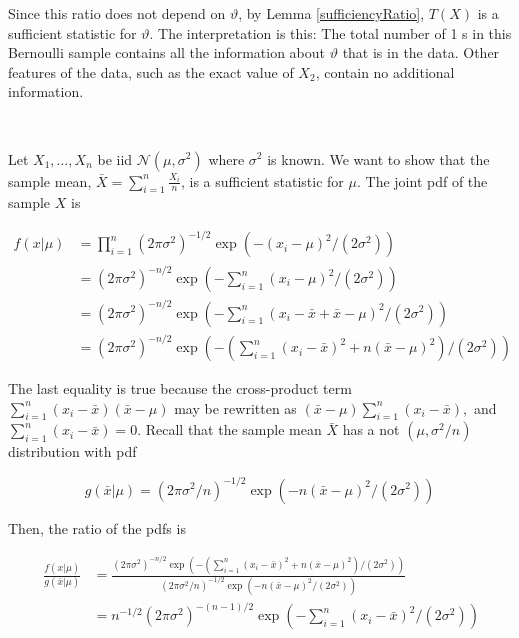 \documentclass[ 11pt,%
				a4paper,%
				twoside,%
				headinclude,%
				footinclude = true,%
				cleardoublepage = empty,%
				reqno]{scrbook}
\begin{document}
Since this ratio does not depend on $\vartheta$, by Lemma \ref{sufficiencyRatio}, $T({X})$ is a sufficient statistic for $\vartheta$. The interpretation is this: The total number of 1 s in this Bernoulli sample contains all the information about $\vartheta$ that is in the data. Other features of the data, such as the exact value of $X_{2}$, contain no additional information.

\begin{example}~\label{normal sufficient example}

Let $X_{1}, \ldots, X_{n}$ be iid  $\mathcal{N}\left(\mu, \sigma^{2}\right)$ where $\sigma^{2}$ is known. We want to show that the sample mean, $\bar{X}=\sum_{i=1}^{n} \frac{X_i}{n}$, is a sufficient statistic for $\mu .$ The joint pdf of the sample ${X}$ is

\[
\begin{aligned}
f({x} | \mu) &=\prod_{i=1}^{n}\left(2 \pi \sigma^{2}\right)^{-1 / 2} \exp \left(-\left(x_{i}-\mu\right)^{2} /\left(2 \sigma^{2}\right)\right) \\
&=\left(2 \pi \sigma^{2}\right)^{-n / 2} \exp \left(-\sum_{i=1}^{n}\left(x_{i}-\mu\right)^{2} /\left(2 \sigma^{2}\right)\right)\\
&= \left(2 \pi \sigma^{2}\right)^{-n / 2} \exp \left(-\sum_{i=1}^{n}\left(x_{i}-\bar{x}+\bar{x}-\mu\right)^{2} /\left(2 \sigma^{2}\right)\right)\\
&=\left(2 \pi \sigma^{2}\right)^{-n / 2} \exp \left(-\left(\sum_{i=1}^{n}\left(x_{i}-\bar{x}\right)^{2}+n(\bar{x}-\mu)^{2}\right) /\left(2 \sigma^{2}\right)\right)
\end{aligned}
\]



The last equality is true because the cross-product term $\sum_{i=1}^{n}\left(x_{i}-\bar{x}\right)(\bar{x}-\mu)$ may be rewritten as $(\bar{x}-\mu) \sum_{i=1}^{n}\left(x_{i}-\bar{x}\right),$ and $\sum_{i=1}^{n}\left(x_{i}-\bar{x}\right)=0 .$ Recall that the sample
mean $\bar{X}$ has a not $\left(\mu, \sigma^{2} / n\right)$ distribution with pdf

\[
g(\bar{x}|\mu) = \left(2 \pi \sigma^{2} / n\right)^{-1 / 2} \exp \left(-n(\bar{x}-\mu)^{2} /\left(2 \sigma^{2}\right)\right)
  \]

Then, the ratio of the pdfs is

\begin{equation}~\label{normalratio}
\begin{aligned}
\frac{f(x | \mu)}{g(\bar{x} | \mu)} &=\frac{\left(2 \pi \sigma^{2}\right)^{-n / 2} \exp \left(-\left(\sum_{i=1}^{n}\left(x_{i}-\bar{x}\right)^{2}+n(\bar{x}-\mu)^{2}\right) /\left(2 \sigma^{2}\right)\right)}{\left(2 \pi \sigma^{2} / n\right)^{-1 / 2} \exp \left(-n(\bar{x}-\mu)^{2} /\left(2 \sigma^{2}\right)\right)} \\
&=n^{-1 / 2}\left(2 \pi \sigma^{2}\right)^{-(n-1) / 2} \exp \left(-\sum_{i=1}^{n}\left(x_{i}-\bar{x}\right)^{2} /\left(2 \sigma^{2}\right)\right)
\end{aligned}
\end{equation}


\end{example}
\end{document}
